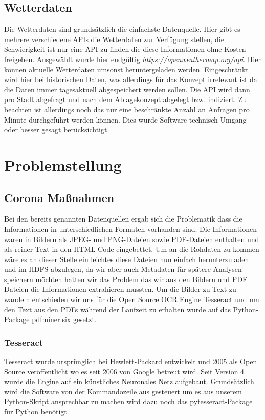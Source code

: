 \documentclass[12pt,oneside,a4paper,parskip]{scrbook}
\begin{document}
\section{Wetterdaten}
Die Wetterdaten sind grunds\"atzlich die einfachste Datenquelle. Hier gibt es mehrere verschiedene APIs die Wetterdaten zur Verfügung stellen, die Schwierigkeit ist nur eine API zu finden die diese Informationen ohne Kosten freigeben.
Ausgew\"ahlt wurde hier endg\"ultig \textit{https://openweathermap.org/api}. Hier k\"onnen aktuelle Wetterdaten umsonst heruntergeladen werden. Eingeschr\"ankt wird hier bei historischen Daten, was allerdings f\"ur das Konzept irrelevant ist da die Daten immer tagesaktuell abgespeichert werden sollen. \newline
Die API wird dann pro Stadt abgefragt und nach dem Ablagekonzept abgelegt bzw. indiziert. Zu beachten ist allerdings noch das nur eine beschr\"ankte Anzahl an Anfragen pro Minute durchgef\"uhrt werden k\"onnen. Dies wurde Software technisch Umgang oder besser gesagt ber\"ucksichtigt.

\chapter{Problemstellung}
\section{Corona Maßnahmen}
Bei den bereits genannten Datenquellen ergab sich die Problematik dass die Informationen in unterschiedlichen Formaten vorhanden sind. Die Informationen waren in Bildern als JPEG- und PNG-Dateien sowie PDF-Dateien enthalten und als reiner Text in den HTML-Code eingebettet. Um an die Rohdaten zu kommen wäre es an dieser Stelle ein leichtes diese Dateien nun einfach herunterzuladen und im HDFS abzulegen, da wir aber auch Metadaten für spätere Analysen speichern möchten hatten wir das Problem das wir aus den Bildern und PDF Dateien die Informationen extrahieren mussten. Um die Bilder zu Text zu wandeln entschieden wir uns für die Open Source OCR Engine Tesseract und um den Text aus den PDFs während der Laufzeit zu erhalten wurde auf das Python-Package pdfminer.six gesetzt.

\subsection{Tesseract}
Tesseract wurde ursprünglich bei Hewlett-Packard entwickelt und 2005 als Open Source veröffentlicht wo es seit 2006 von Google betreut wird.
Seit Version 4 wurde die Engine auf ein künstliches Neuronales Netz aufgebaut. Grundsätzlich wird die Software von der Kommandozeile aus gesteuert um es aus unserem Python-Skript ansprechbar zu machen wird dazu noch das pytesseract-Package für Python benötigt.
\end{document}
